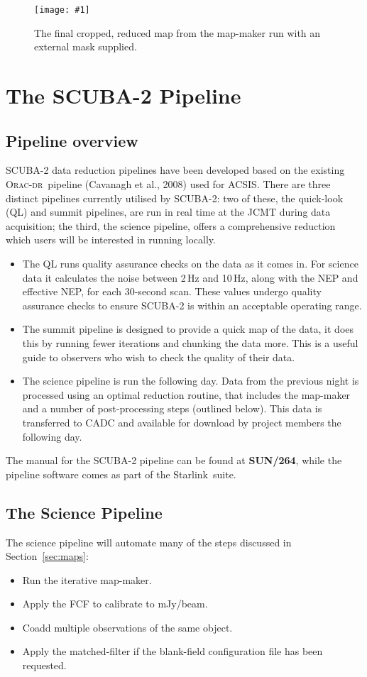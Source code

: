 \documentclass[twoside,11pt]{article}
\newcommand{\htmladdnormallink}[2]{#1}
\newcommand{\htmladdimg}[1]{}
\newcommand{\htmlref}[2]{#1}
\newcommand{\latexhtml}[2]{#1}
\newcommand{\xref}[3]{#1}
\newcommand{\xlabel}[1]{}
\renewcommand{\_}{\texttt{\symbol{95}}}
\newcommand{\starlink}{\htmladdnormallink{Starlink}{http://starlink.jach.hawaii.edu}}
\newcommand{\oracdr}{\htmladdnormallink{\textsc{Orac-dr}}{http://www.oracdr.org/oracdr}}
\newcommand{\pipelinesun}{\xref{\textbf{SUN/264}}{sun264}{}}
\newcommand{\myfig}[5]{
  \begin{figure}#2
    \centering\texttt{[image: \#1]}
    \typeout{#1.eps inserted on page \arabic{page}}
    \caption{\label{#4}\small #5}
  \end{figure}
}
\newcommand{\myfig}[5]{
    \label{#4} \htmladdimg{#1.png}\\
    \\
    Figure: #5\\
  }
\newcommand{\cref}[3]{\latexhtml{#1~\ref{#2}}{\htmlref{#3}{#2}}}
\begin{document}
\myfig{sc21_gal12_crop}{[t!]}{width=0.8\hsize}{fig:crop_map}{
The final cropped, reduced map from the map-maker run with
an external mask supplied.}


\clearpage
\section{\xlabel{pipeline}The SCUBA-2 Pipeline}
\label{sec:pipe}
\subsection{\xlabel{pl_overview}Pipeline overview}

SCUBA-2 data reduction pipelines have been developed based on the
existing \oracdr\ pipeline (Cavanagh et al., 2008\cite{oracdr}) used
for ACSIS. There are three distinct pipelines currently utilised by
SCUBA-2: two of these, the quick-look (QL) and summit pipelines, are
run in real time at the JCMT during data acquisition; the third, the science
pipeline, offers a comprehensive reduction which users will be
interested in running locally.

\begin{itemize}
\item The QL runs quality assurance checks on the data as it comes in.
For science data it calculates the noise between 2\,Hz and 10\,Hz,
along with the NEP and effective NEP, for each 30-second scan. These
values undergo quality assurance checks to ensure SCUBA-2 is within
an acceptable operating range.
\item The summit pipeline is designed to provide a quick map of the
data, it does this by running fewer iterations and chunking the data
more. This is a useful guide to observers who wish to check the
quality of their data.
\item The science pipeline is run the following day. Data from the
previous night is processed using an optimal reduction routine, that
includes the map-maker and a number of post-processing steps (outlined
below). This data is transferred to CADC and available for download
by project members the following day.
\end{itemize}

The manual for the SCUBA-2 pipeline can be found at \pipelinesun,
while the pipeline software comes as part of the \starlink\ suite.


\subsection{\xlabel{science_pl}The Science Pipeline}
The science pipeline will automate many of the steps discussed in
\cref{Section}{sec:maps}{Reducing your data}:
\vspace{-0.3cm}
\begin{itemize}\itemsep-0.3em
\item Run the iterative map-maker.
\item Apply the FCF to calibrate to mJy/beam.
\item Coadd multiple observations of the same object.
\item Apply the matched-filter if the blank-field configuration file
has been requested.
\end{itemize}
\end{document}
